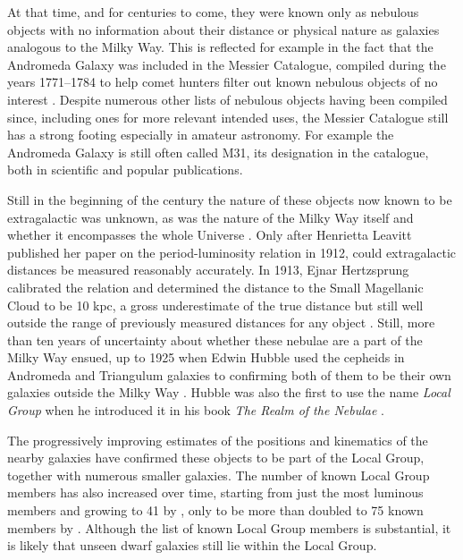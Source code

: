 \documentclass[english, twoside]{HYgradu}
\begin{document}
At that time, and for centuries to come, they were known only as nebulous objects with no information about their distance or physical nature as galaxies analogous to the Milky Way. This is reflected for example in the fact that the Andromeda Galaxy was included in the Messier Catalogue, compiled during the years 1771--1784 to help comet hunters filter out known nebulous objects of no interest \citep{longair2006cosmic}. Despite numerous other lists of nebulous objects having been compiled since, including ones for more relevant intended uses, the Messier Catalogue still has a strong footing especially in amateur astronomy. For example the Andromeda Galaxy is still often called M31, its designation in the catalogue, both in scientific and popular publications.

Still in the beginning of the  century the nature of these objects now known to be extragalactic was unknown, as was the nature of the Milky Way itself and whether it  encompasses the whole Universe \citep{longair2006cosmic}. Only after Henrietta Leavitt published her paper on the period-luminosity relation in 1912, could extragalactic distances be measured reasonably accurately. In 1913, Ejnar Hertzsprung calibrated the relation and determined the distance to the Small Magellanic Cloud to be 10 kpc, a gross underestimate of the true distance but still well outside the range of previously measured distances for any object \citep{longair2006cosmic}. Still, more than ten years of uncertainty about whether these nebulae are a part of the Milky Way ensued, up to 1925 when Edwin Hubble used the cepheids in Andromeda and Triangulum galaxies to confirming both of them to be their own galaxies outside the Milky Way \citep{longair2006cosmic}. Hubble was also the first to use the name \textit{Local Group} when he introduced it in his book \textit{The Realm of the Nebulae} \citep{hubble1936realm}.

The progressively improving estimates of the positions and kinematics of the nearby galaxies have confirmed these objects to be part of the Local Group, together with numerous smaller galaxies. The number of known Local Group members has also increased over time, starting from just the most luminous members and growing to 41 by \citeyear{mateo1998dwarf}, only to be more than doubled to 75 known members by \citeyear{mcconnachie2012observed} \citep{mateo1998dwarf, mcconnachie2012observed}. Although the list of known Local Group members is substantial, it is likely that unseen dwarf galaxies still lie within the Local Group.
\end{document}

